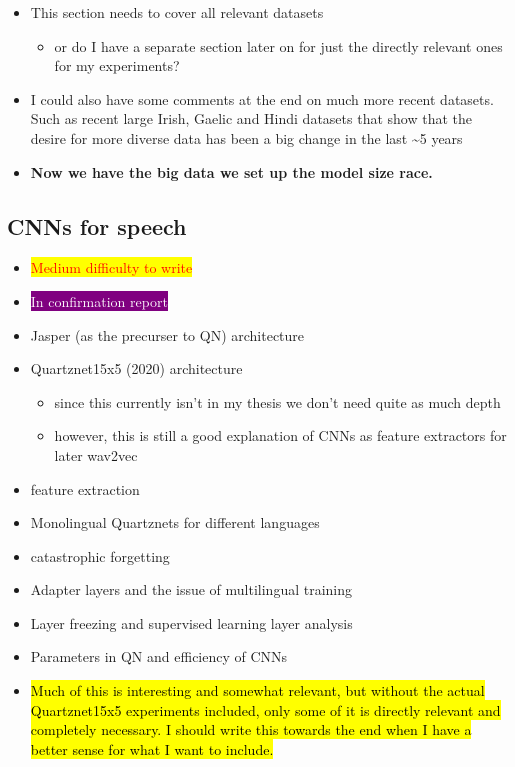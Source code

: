 \begin{itemize}
\begin{itemize}
        \item There are more, but since I don't use any of these maybe don't spend too much time with this.
    \end{itemize}
    \item This section needs to cover all relevant datasets
    \begin{itemize}
        \item or do I have a separate section later on for just the directly relevant ones for my experiments?
    \end{itemize}
    \item I could also have some comments at the end on much more recent datasets. Such as recent large Irish, Gaelic and Hindi datasets that show that the desire for more diverse data has been a big change in the last \textasciitilde 5 years
    \item \textbf{Now we have the big data we set up the model size race.}
\end{itemize}

\subsection{CNNs for speech}
\begin{itemize}
    \item \colorbox{yellow}{\textcolor{red}{Medium difficulty to write}}
    \item \colorbox{purple}{\textcolor{white}{In confirmation report}}
    \item Jasper (as the precurser to QN) architecture \cite{needsjaspercitation}
    \item Quartznet15x5 (2020) architecture \cite{quartznet}
    \begin{itemize}
        \item since this currently isn't in my thesis we don't need quite as much depth
        \item however, this is still a good explanation of CNNs as feature extractors for later wav2vec
    \end{itemize}
    \item feature extraction
    \item Monolingual Quartznets for different languages
    \item catastrophic forgetting
    \item Adapter layers and the issue of multilingual training
    \item Layer freezing and supervised learning layer analysis
    \item Parameters in QN and efficiency of CNNs
    \item \hl{Much of this is interesting and somewhat relevant, but without the actual Quartznet15x5 experiments included, only some of it is directly relevant and completely necessary. I should write this towards the end when I have a better sense for what I want to include.}
\end{itemize}




